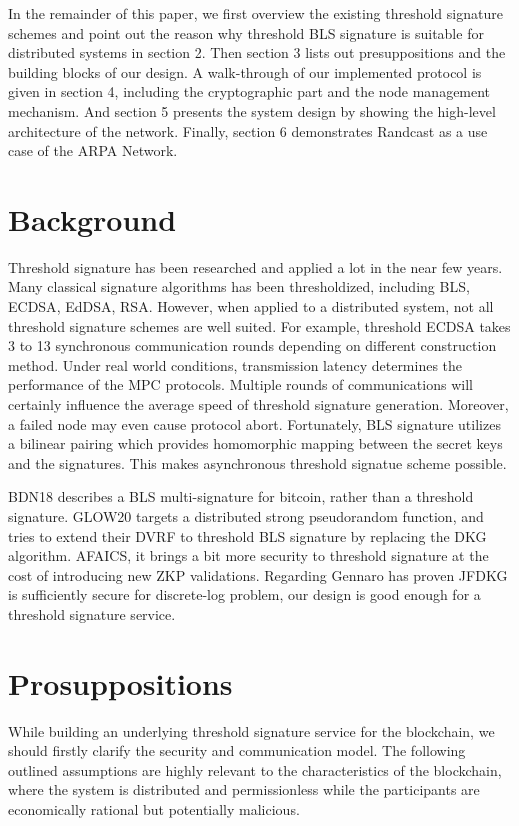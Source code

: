 \documentclass[11pt]{article}
\begin{document}
In the remainder of this paper, we first overview the existing threshold signature schemes and point out the reason why threshold BLS signature is suitable for distributed systems in section 2. Then section 3 lists out presuppositions and the building blocks of our design. A walk-through of our implemented protocol is given in section 4, including the cryptographic part and the node management mechanism. And section 5 presents the system design by showing the high-level architecture of the network. Finally, section 6 demonstrates Randcast as a use case of the ARPA Network.

\section{Background}

Threshold signature has been researched and applied a lot in the near few years. Many classical signature algorithms has been thresholdized, including BLS, ECDSA\cite{gennaro2018fast}, EdDSA\cite{stinson2001provably}, RSA\cite{damgaard2001practical}. However, when applied to a distributed system, not all threshold signature schemes are well suited. For example, threshold ECDSA takes 3 to 13 synchronous communication rounds depending on different construction method\cite{aumasson2020survey}. Under real world conditions, transmission latency determines the performance of the MPC protocols. Multiple rounds of communications will certainly influence the average speed of threshold signature generation. Moreover, a failed node may even cause protocol abort. Fortunately, BLS signature utilizes a bilinear pairing which provides homomorphic mapping between the secret keys and the signatures. This makes asynchronous threshold signatue scheme possible.  

BDN18 describes a BLS multi-signature for bitcoin, rather than a threshold signature. GLOW20 targets a distributed strong pseudorandom function, and tries to extend their DVRF to threshold BLS signature by replacing the DKG algorithm. AFAICS, it brings a bit more security to threshold signature at the cost of introducing new ZKP validations. Regarding Gennaro has proven JFDKG is sufficiently secure for discrete-log problem, our design is good enough for a threshold signature service.

\section{Prosuppositions}

While building an underlying threshold signature service for the blockchain, we should firstly clarify the security and communication model. The following outlined assumptions are highly relevant to the characteristics of the blockchain, where the system is distributed and permissionless while the participants are economically rational but potentially malicious.
\end{document}
